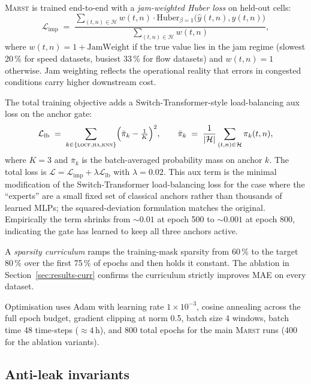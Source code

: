 \documentclass[11pt]{article}
\newcommand{\MARST}{\textsc{Marst}\xspace}
\newcommand{\Hset}{\mathcal{H}}
\newcommand{\LOCF}{\textsc{locf}\xspace}
\newcommand{\HA}{\textsc{ha}\xspace}
\newcommand{\KNN}{\textsc{knn}\xspace}
\begin{document}
\MARST is trained end-to-end with a \emph{jam-weighted Huber loss} on
held-out cells:
\begin{equation}
\mathcal{L}_{\text{imp}} \;=\;
\frac{\sum_{(t,n) \in \Hset} w(t, n) \cdot
      \mathrm{Huber}_{\beta=1}\bigl(\hat{y}(t,n), y(t,n)\bigr)}
     {\sum_{(t,n) \in \Hset} w(t, n)},
\label{eq:loss-imp}
\end{equation}
where $w(t, n) = 1 + \mathrm{JamWeight}$ if the true value lies in the
jam regime (slowest 20\,\% for speed datasets, busiest 33\,\% for flow
datasets) and $w(t, n) = 1$ otherwise.  Jam weighting reflects the
operational reality that errors in congested conditions carry higher
downstream cost.

The total training objective adds a Switch-Transformer-style
load-balancing aux loss on the anchor gate:
\begin{equation}
\mathcal{L}_{\text{lb}} \;=\;
\sum_{k \in \{\LOCF, \HA, \KNN\}}
\Bigl( \bar{\pi}_{k} - \tfrac{1}{K} \Bigr)^{2},
\qquad
\bar{\pi}_{k} \;=\;
\frac{1}{|\Hset|} \sum_{(t, n) \in \Hset} \pi_{k}(t, n),
\label{eq:loss-lb}
\end{equation}
where $K = 3$ and $\bar{\pi}_{k}$ is the batch-averaged probability
mass on anchor $k$.  The total loss is
$\mathcal{L} = \mathcal{L}_{\text{imp}} + \lambda \mathcal{L}_{\text{lb}}$
with $\lambda = 0.02$.  This aux term is the minimal modification of
the Switch-Transformer load-balancing loss for the case where the
``experts'' are a small fixed set of classical anchors rather than
thousands of learned MLPs; the squared-deviation formulation matches
the original.  Empirically the term shrinks from $\sim 0.01$ at epoch
500 to $\sim 0.001$ at epoch 800, indicating the gate has learned to
keep all three anchors active.

A \emph{sparsity curriculum} ramps the training-mask sparsity from
60\,\% to the target 80\,\% over the first 75\,\% of epochs and then
holds it constant.  The ablation in Section~\ref{sec:results-curr}
confirms the curriculum strictly improves MAE on every dataset.

Optimisation uses Adam with learning rate $1 \times 10^{-3}$, cosine
annealing across the full epoch budget, gradient clipping at norm 0.5,
batch size 4 windows, batch time 48 time-steps ($\approx 4$\,h), and
800 total epochs for the main \MARST runs (400 for the ablation
variants).

\subsection{Anti-leak invariants}
\label{sec:model-leak}
\end{document}
